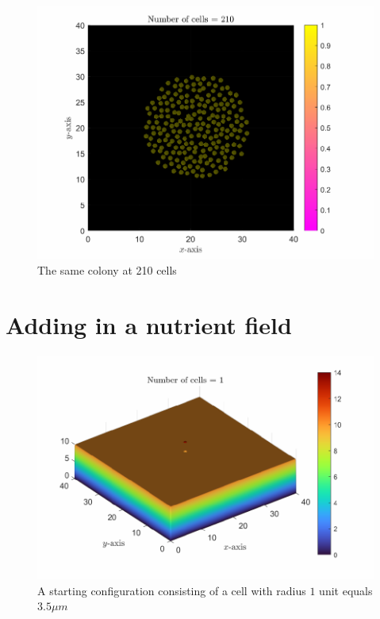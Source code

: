 \begin{figure}[h]
\centering
\includegraphics[width=1\textwidth]{chapter1/figures/ColonySimulationDemo_N_210.pdf}
\caption{The same colony at 210 cells}
\label{fig:ColonySimulationN210}
\end{figure}
\filbreak

\section{Adding in a nutrient field}


\begin{figure}[h]
\centering
\includegraphics[width=1\textwidth]{chapter1/figures/ColonySimulationDemoNutrientField_N_1.pdf}
\caption{A starting configuration consisting of a cell with radius $1$ unit equals $3.5 \mu m$}
\label{fig:ColonySimulationStartingCellNutrientField}
\end{figure}
\filbreak


